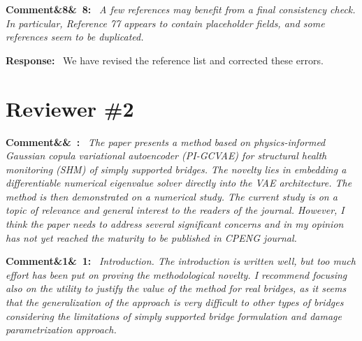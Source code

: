 \documentclass[11pt]{article}
\newenvironment{rcomment}[1]{\par\bigskip\noindent\textbf{Comment\ifx&#1&\else\ #1\fi:}\ \itshape}{\par}
\newenvironment{response}{\par\smallskip\noindent\color{resp}\textbf{Response:}\ }{\par}
\begin{document}
\begin{rcomment}{8}
A few references may benefit from a final consistency check. In particular, Reference 77 appears to contain placeholder fields, and some references seem to be duplicated.
\end{rcomment}

\begin{response}
We have revised the reference list and corrected these errors.
\end{response}


\section{Reviewer \#2}

\begin{rcomment}{}
The paper presents a method based on physics-informed Gaussian copula variational autoencoder (PI-GCVAE) for
structural health monitoring (SHM) of simply supported bridges. The novelty lies in embedding a differentiable numerical
eigenvalue solver directly into the VAE architecture. The method is then demonstrated on a numerical study. The current
study is on a topic of relevance and general interest to the readers of the journal. However, I think the paper needs to
address several significant concerns and in my opinion has not yet reached the maturity to be published in CPENG
journal.
\end{rcomment}

\begin{rcomment}{1}
Introduction. The introduction is written well, but too much effort has been put on proving the methodological novelty. I recommend focusing also on the utility to justify the value of the method for real bridges, as it seems that the generalization of the approach is very difficult to other types of bridges considering the limitations of simply
supported bridge formulation and damage parametrization approach.
\end{rcomment}
\end{document}
